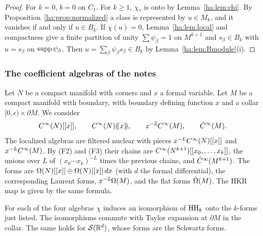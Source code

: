 \begin{proof}
For \(k=0\), \(b=0\) on \(C_1\). For \(k\ge1\), \(\chi_*\) is onto by
Lemma~\ref{ha:lem:chi}. By Proposition~\ref{ha:prop:normalized} a class is
represented by \(u\in M_k\), and it vanishes if and only if \(u\in B_k\).
If \(\chi(u)=0\), Lemma~\ref{ha:lem:local} and compactness give a finite
partition of unity \(\sum\psi_\beta=1\) on \(M^{k+1}\) and
\(s_\beta\in B_k\) with \(u=s_\beta\) on \(\operatorname{supp}\psi_\beta\). Then
\(u=\sum_\beta\psi_\beta s_\beta\in B_k\) by Lemma~\ref{ha:lem:Bmodule}(i).
\end{proof}

\subsubsection*{The coefficient algebras of the notes}
Let \(N\) be a compact manifold with corners and \(x\) a formal variable.
Let \(M\) be a compact manifold with boundary, with boundary defining
function \(x\) and a collar \([0,\epsilon)\times\partial M\). We consider
\[
 C^\infty(N)[[x]],\qquad C^\infty(N)(\!(x)\!),\qquad x^{-\mathbb Z}C^\infty(M),\qquad\dot C^\infty(M).
\]
The localized algebras are filtered nuclear with pieces \(x^{-L}C^\infty(N)
[[x]]\) and \(x^{-L}C^\infty(M)\). By (F2) and (F3) their chains are
\(C^\infty(N^{k+1})[[x_0,\dots,x_k]]\), the unions over \(L\) of
\((x_0\cdots x_k)^{-L}\) times the previous chains, and \(\dot C^\infty(M^{k+1})\).
The forms are \(\Omega(N)[[x]]\oplus\Omega(N)[[x]]\,dx\) (with \(d\) the formal
differential), the corresponding Laurent forms, \(x^{-\mathbb Z}\Omega(M)\), and the
flat forms \(\dot\Omega(M)\). The HKR map is given by the same formula.

\begin{theorem}
\label{ha:thm:variants}
For each of the four algebras \(\chi\) induces an isomorphism of
\(\operatorname{HH}_k\) onto the \(k\)-forms just listed. The isomorphisms commute with
Taylor expansion at \(\partial M\) in the collar. The same holds for
\(\mathcal S(\mathbb R^d)\), whose forms are the Schwartz forms.
\end{theorem}

